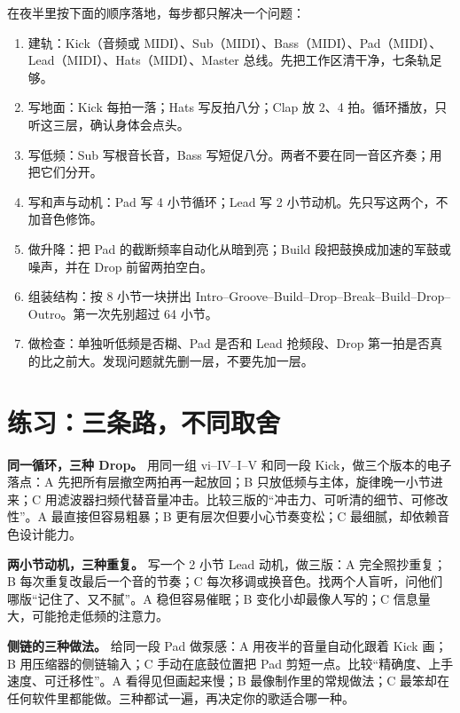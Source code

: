 在夜半里按下面的顺序落地，每步都只解决一个问题：

\begin{enumerate}
\item 建轨：Kick（音频或 MIDI）、Sub（MIDI）、Bass（MIDI）、Pad（MIDI）、Lead（MIDI）、Hats（MIDI）、Master 总线。先把工作区清干净，七条轨足够。
\item 写地面：Kick 每拍一落；Hats 写反拍八分；Clap 放 2、4 拍。循环播放，只听这三层，确认身体会点头。
\item 写低频：Sub 写根音长音，Bass 写短促八分。两者不要在同一音区齐奏；用把它们分开。
\item 写和声与动机：Pad 写 4 小节循环；Lead 写 2 小节动机。先只写这两个，不加音色修饰。
\item 做升降：把 Pad 的截断频率自动化从暗到亮；Build 段把鼓换成加速的军鼓或噪声，并在 Drop 前留两拍空白。
\item 组装结构：按 8 小节一块拼出 Intro--Groove--Build--Drop--Break--Build--Drop--Outro。第一次先别超过 64 小节。
\item 做检查：单独听低频是否糊、Pad 是否和 Lead 抢频段、Drop 第一拍是否真的比之前大。发现问题就先删一层，不要先加一层。
\end{enumerate}

\section{练习：三条路，不同取舍}
\label{sec:edm-practice}

\begin{exercise}
\textbf{同一循环，三种 Drop。} 用同一组 vi--IV--I--V 和同一段 Kick，做三个版本的电子落点：A 先把所有层撤空两拍再一起放回；B 只放低频与主体，旋律晚一小节进来；C 用滤波器扫频代替音量冲击。比较三版的“冲击力、可听清的细节、可修改性”。A 最直接但容易粗暴；B 更有层次但要小心节奏变松；C 最细腻，却依赖音色设计能力。
\end{exercise}

\begin{exercise}
\textbf{两小节动机，三种重复。} 写一个 2 小节 Lead 动机，做三版：A 完全照抄重复；B 每次重复改最后一个音的节奏；C 每次移调或换音色。找两个人盲听，问他们哪版“记住了、又不腻”。A 稳但容易催眠；B 变化小却最像人写的；C 信息量大，可能抢走低频的注意力。
\end{exercise}

\begin{exercise}
\textbf{侧链的三种做法。} 给同一段 Pad 做泵感：A 用夜半的音量自动化跟着 Kick 画；B 用压缩器的侧链输入；C 手动在底鼓位置把 Pad 剪短一点。比较“精确度、上手速度、可迁移性”。A 看得见但画起来慢；B 最像制作里的常规做法；C 最笨却在任何软件里都能做。三种都试一遍，再决定你的歌适合哪一种。
\end{exercise}

